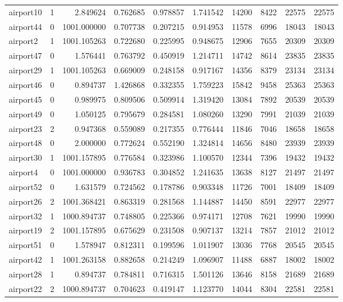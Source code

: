 \begin{longtable}{|l|r|r|r|r|r|r|r|r|r|}
airport10 & 1 & 2.849624 & 0.762685 & 0.978857 & 1.741542 & 14200 & 8422 & 22575 & 22575 \\
airport44 & 0 & 1001.000000 & 0.707738 & 0.207215 & 0.914953 & 11578 & 6996 & 18043 & 18043 \\
airport2 & 1 & 1001.105263 & 0.722680 & 0.225995 & 0.948675 & 12906 & 7655 & 20309 & 20309 \\
airport47 & 0 & 1.576441 & 0.763792 & 0.450919 & 1.214711 & 14742 & 8614 & 23835 & 23835 \\
airport29 & 1 & 1001.105263 & 0.669009 & 0.248158 & 0.917167 & 14356 & 8379 & 23134 & 23134 \\
airport46 & 0 & 0.894737 & 1.426868 & 0.332355 & 1.759223 & 15842 & 9458 & 25363 & 25363 \\
airport45 & 0 & 0.989975 & 0.809506 & 0.509914 & 1.319420 & 13084 & 7892 & 20539 & 20539 \\
airport49 & 0 & 1.050125 & 0.795679 & 0.284581 & 1.080260 & 13290 & 7991 & 21039 & 21039 \\
airport23 & 2 & 0.947368 & 0.559089 & 0.217355 & 0.776444 & 11846 & 7046 & 18658 & 18658 \\
airport48 & 0 & 2.000000 & 0.772624 & 0.552190 & 1.324814 & 14656 & 8480 & 23939 & 23939 \\
airport30 & 1 & 1001.157895 & 0.776584 & 0.323986 & 1.100570 & 12344 & 7396 & 19432 & 19432 \\
airport4 & 0 & 1001.000000 & 0.936783 & 0.304852 & 1.241635 & 13638 & 8127 & 21497 & 21497 \\
airport52 & 0 & 1.631579 & 0.724562 & 0.178786 & 0.903348 & 11726 & 7001 & 18409 & 18409 \\
airport26 & 2 & 1001.368421 & 0.863319 & 0.281568 & 1.144887 & 14450 & 8591 & 22977 & 22977 \\
airport32 & 1 & 1000.894737 & 0.748805 & 0.225366 & 0.974171 & 12708 & 7621 & 19990 & 19990 \\
airport19 & 2 & 1001.157895 & 0.675629 & 0.231508 & 0.907137 & 13214 & 7857 & 21012 & 21012 \\
airport51 & 0 & 1.578947 & 0.812311 & 0.199596 & 1.011907 & 13036 & 7768 & 20545 & 20545 \\
airport42 & 1 & 1001.263158 & 0.882658 & 0.214249 & 1.096907 & 11488 & 6887 & 18002 & 18002 \\
airport28 & 1 & 0.894737 & 0.784811 & 0.716315 & 1.501126 & 13646 & 8158 & 21689 & 21689 \\
airport22 & 2 & 1000.894737 & 0.704623 & 0.419147 & 1.123770 & 14044 & 8304 & 22581 & 22581 \\

\end{longtable}
